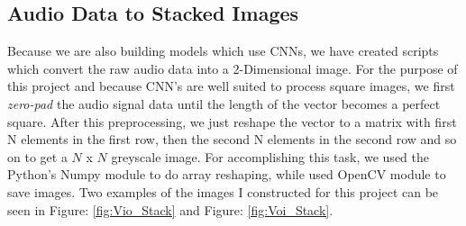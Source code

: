 \documentclass[letterpaper, 12 pt, conference]{ieeeconf}  %
\begin{document}
\subsection{Audio Data to Stacked Images}
Because we are also building models which use CNNs, we have created scripts which convert the raw audio data into a 2-Dimensional image. For the purpose of this project and because CNN's are well suited to process square images, we first \textit{zero-pad} the audio signal data until the length of the vector becomes a perfect square. After this preprocessing, we just reshape the vector to a matrix with first N elements in the first row, then the second N elements in the second row and so on to get a $N$ x $N$ greyscale image. For accomplishing this task, we used the Python's Numpy module to do array reshaping, while used OpenCV module to save images. Two examples of the images I constructed for this project can be seen in Figure: \ref{fig:Vio_Stack} and Figure: \ref{fig:Voi_Stack}.
\end{document}
